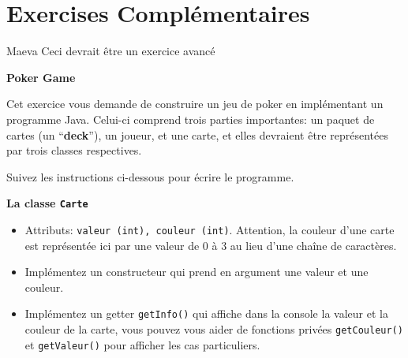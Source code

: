 \newpage

\section{Exercises Complémentaires}

\begin{note}{Maeva}
    Ceci devrait être un exercice avancé
\end{note}
\begin{Exercice}[15 minutes]\textbf{Poker Game}

Cet exercice vous demande de construire un jeu de poker en implémentant un programme Java. Celui-ci comprend trois parties importantes: un paquet de cartes (un ``\textbf{deck}''), un joueur, et une carte, et elles devraient être représentées par trois classes respectives.

Suivez les instructions ci-dessous pour écrire le programme.

\textbf{La classe \lstinline{Carte}}
\begin{itemize}
    \item Attributs: \lstinline{valeur (int), couleur (int)}. Attention, la couleur d'une carte est représentée ici par une valeur de 0 à 3 au lieu d'une chaîne de caractères.
    \item Implémentez un constructeur qui prend en argument une valeur et une couleur.
    \item Implémentez un getter \lstinline{getInfo()} qui affiche dans la console la valeur et la couleur de la carte, vous pouvez vous aider de fonctions privées
    \lstinline{getCouleur()} et \lstinline{getValeur()} pour afficher les cas particuliers.
\end{itemize}





\end{Exercice}
